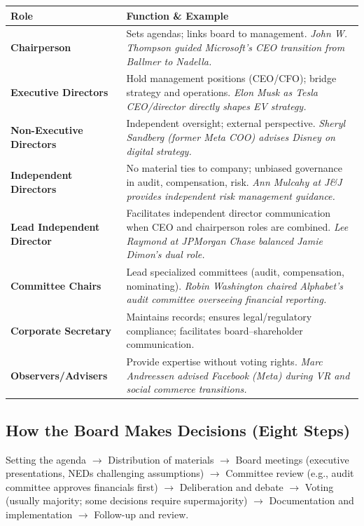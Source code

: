 \documentclass[11pt, letterpaper]{article}
\begin{document}
\begin{center}
\begin{tabular}{>{\bfseries}p{3.5cm} p{9cm}}
\toprule
Role & Function \& Example \\
\midrule
Chairperson & Sets agendas; links board to management. \textit{John W. Thompson guided Microsoft's CEO transition from Ballmer to Nadella.} \\
\addlinespace
Executive Directors & Hold management positions (CEO/CFO); bridge strategy and operations. \textit{Elon Musk as Tesla CEO/director directly shapes EV strategy.} \\
\addlinespace
Non-Executive Directors & Independent oversight; external perspective. \textit{Sheryl Sandberg (former Meta COO) advises Disney on digital strategy.} \\
\addlinespace
Independent Directors & No material ties to company; unbiased governance in audit, compensation, risk. \textit{Ann Mulcahy at J\&J provides independent risk management guidance.} \\
\addlinespace
Lead Independent Director & Facilitates independent director communication when CEO and chairperson roles are combined. \textit{Lee Raymond at JPMorgan Chase balanced Jamie Dimon's dual role.} \\
\addlinespace
Committee Chairs & Lead specialized committees (audit, compensation, nominating). \textit{Robin Washington chaired Alphabet's audit committee overseeing financial reporting.} \\
\addlinespace
Corporate Secretary & Maintains records; ensures legal/regulatory compliance; facilitates board--shareholder communication. \\
\addlinespace
Observers/Advisers & Provide expertise without voting rights. \textit{Marc Andreessen advised Facebook (Meta) during VR and social commerce transitions.} \\
\bottomrule
\end{tabular}
\end{center}

\subsection{How the Board Makes Decisions (Eight Steps)}

Setting the agenda $\rightarrow$ Distribution of materials $\rightarrow$ Board meetings (executive presentations, NEDs challenging assumptions) $\rightarrow$ Committee review (e.g., audit committee approves financials first) $\rightarrow$ Deliberation and debate $\rightarrow$ Voting (usually majority; some decisions require supermajority) $\rightarrow$ Documentation and implementation $\rightarrow$ Follow-up and review.
\end{document}
